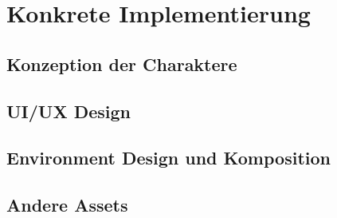 \chapter{Konkrete Implementierung}
\label{cha:sa_Einleitung}

\section{Konzeption der Charaktere}

\section{UI/UX Design}

\section{Environment Design und Komposition}

\section{Andere Assets}


